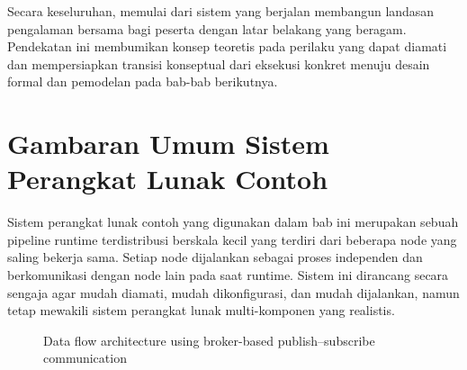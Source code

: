 Secara keseluruhan, memulai dari sistem yang berjalan membangun landasan
pengalaman bersama bagi peserta dengan latar belakang yang beragam. Pendekatan
ini membumikan konsep teoretis pada perilaku yang dapat diamati dan mempersiapkan
transisi konseptual dari eksekusi konkret menuju desain formal dan pemodelan pada
bab-bab berikutnya.

\section{Gambaran Umum Sistem Perangkat Lunak Contoh}

Sistem perangkat lunak contoh yang digunakan dalam bab ini merupakan sebuah
pipeline runtime terdistribusi berskala kecil yang terdiri dari beberapa node
yang saling bekerja sama. Setiap node dijalankan sebagai proses independen dan
berkomunikasi dengan node lain pada saat runtime. Sistem ini dirancang secara
sengaja agar mudah diamati, mudah dikonfigurasi, dan mudah dijalankan, namun tetap
mewakili sistem perangkat lunak multi-komponen yang realistis.

\begin{figure}[htbp]
\centering
{}
\caption{Data flow architecture using broker-based publish--subscribe communication}
\label{fig:broker-pubsub-architecture}
\end{figure}


